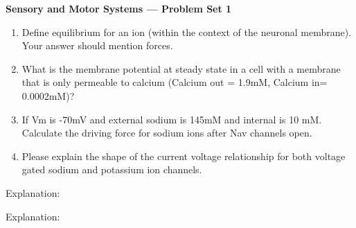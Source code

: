 \documentclass[plain,worksheet,]{inVerba-notes}
\begin{document}
\begin{center}
    \Large \textbf{Sensory and Motor Systems --- Problem Set 1}
\end{center}
\medskip
\begin{enumerate}
    \item Define equilibrium for an ion (within the context of the neuronal membrane). Your answer should mention forces.
    
    
    \vspace{80pt}
    
    \item What is the membrane potential at steady state in a cell with a membrane that is only permeable to calcium (Calcium out = 1.9mM, Calcium in= 0.0002mM)? 
    
    \vspace{80pt}

    \item If Vm is -70mV and external sodium is 145mM and internal is 10 mM. Calculate the driving force for sodium ions after Nav channels open.
    
    \vspace{120pt}

    \item Please explain the shape of the current voltage relationship for both voltage gated sodium and potassium ion channels.
\end{enumerate}
    \bigskip
    
    \begin{center}
        
    \end{center}

    Explanation:
    \vspace{80pt}
     
    \begin{center}
    
    \end{center}

    Explanation:
    \vspace{80pt}
\end{document}

